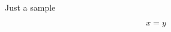 \documentclass[12pt,oldfontcommands,openright,a4paper]{memoir}
\begin{document}
\begin{titlingpage}
Just a sample
\end{titlingpage}

\tableofcontents



$$ x=y $$

\newpage
\end{document}
